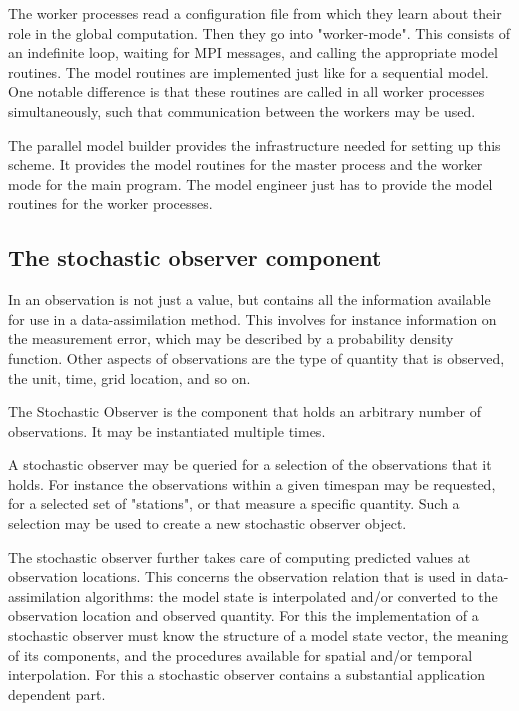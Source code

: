The worker processes read a configuration file from which they learn about their role in the global computation. Then they go into "worker-mode". This consists of an indefinite loop, waiting for MPI messages, and calling the appropriate model routines. The model routines are implemented just like for a sequential model. One notable difference is that these routines are called in all worker processes simultaneously, such that communication between the workers may be used.

The parallel model builder provides the infrastructure needed for setting up this scheme. It provides the model routines for the master process and the worker mode for the \oda main program. The model engineer just has to provide the model routines for the worker processes.

\subsection{The \oda stochastic observer component}

In \oda an observation is not just a value, but contains all the information available for use in a data-assimilation method. This involves for instance information on the measurement error, which may be described by a probability density function. Other aspects of observations are the type of quantity that is observed, the unit, time, grid location, and so on.

The Stochastic Observer is the \oda component that holds an arbitrary number of observations. It may be instantiated multiple times.

A stochastic observer may be queried for a selection of the observations that it holds. For instance the observations within a given timespan may be requested, for a selected set of "stations", or that measure a specific quantity. Such a selection may be used to create a new stochastic observer object.

The stochastic observer further takes care of computing predicted values at observation locations. This concerns the observation relation that is used in data-assimilation algorithms: the model state is interpolated and/or converted to the observation location and observed quantity. For this the implementation of a stochastic observer must know the structure of a model state vector, the meaning of its components, and the procedures available for spatial and/or temporal interpolation. For this a stochastic observer contains a substantial application dependent part.

